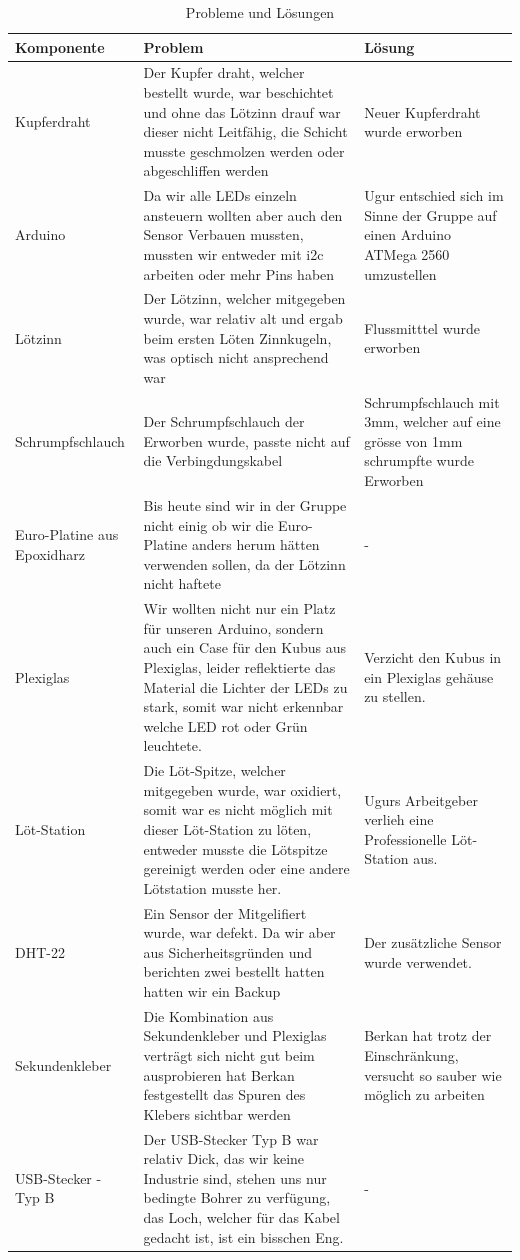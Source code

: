 \documentclass{article}
\newlength\mylength
\begin{document}
\begin{table}
    \caption{Probleme und Lösungen}
    \begin{tabular}{p{\mylength}|p{\mylength}|p{\mylength}}
        \hline
        \textbf{Komponente} & \textbf{Problem}  &\textbf{Lösung}  \\
        \hline \hline
        Kupferdraht & Der Kupfer draht, welcher bestellt wurde, war beschichtet und ohne das Lötzinn drauf war dieser nicht Leitfähig, die Schicht musste geschmolzen werden oder abgeschliffen werden  & Neuer Kupferdraht wurde erworben\\
        Arduino     & Da wir alle LEDs einzeln ansteuern wollten aber auch den Sensor Verbauen mussten, mussten wir entweder mit i2c arbeiten oder mehr Pins haben& Ugur entschied sich im Sinne der Gruppe auf einen Arduino ATMega 2560 umzustellen        \\
        Lötzinn        & Der Lötzinn, welcher mitgegeben wurde, war relativ alt und ergab beim ersten Löten Zinnkugeln, was optisch nicht ansprechend war & Flussmitttel wurde erworben \\
        Schrumpfschlauch         & Der Schrumpfschlauch der Erworben wurde, passte nicht auf die Verbingdungskabel &  Schrumpfschlauch mit 3mm, welcher auf eine grösse von 1mm schrumpfte wurde Erworben\\
        Euro-Platine aus Epoxidharz   & Bis heute sind wir in der Gruppe nicht einig ob wir die Euro-Platine anders herum hätten verwenden sollen, da der Lötzinn nicht haftete & -      \\
        Plexiglas   & Wir wollten nicht nur ein Platz für unseren Arduino, sondern auch ein Case für den Kubus aus Plexiglas, leider reflektierte das Material die Lichter der LEDs zu stark, somit war nicht erkennbar welche LED rot oder Grün leuchtete. & Verzicht den Kubus in ein Plexiglas gehäuse zu stellen.      \\
        Löt-Station & Die Löt-Spitze, welcher mitgegeben wurde, war oxidiert, somit war es nicht möglich mit dieser Löt-Station zu löten, entweder musste die Lötspitze gereinigt werden oder eine andere Lötstation musste her. & Ugurs Arbeitgeber verlieh eine Professionelle Löt-Station aus.\\
        DHT-22   & Ein Sensor der Mitgelifiert wurde, war defekt. Da wir aber aus Sicherheitsgründen und berichten zwei  bestellt hatten hatten wir ein Backup & Der zusätzliche Sensor wurde verwendet.      \\
        Sekundenkleber & Die Kombination aus Sekundenkleber und Plexiglas verträgt sich nicht gut beim ausprobieren hat Berkan festgestellt das Spuren des Klebers sichtbar werden & Berkan hat trotz der Einschränkung, versucht so sauber wie möglich zu arbeiten\\
        USB-Stecker - Typ B & Der USB-Stecker Typ B war relativ Dick, das wir keine Industrie sind, stehen uns nur bedingte Bohrer zu verfügung, das Loch, welcher für das Kabel gedacht ist, ist ein bisschen Eng. & -  \\
        

\end{tabular}
\end{table}
\end{document}
